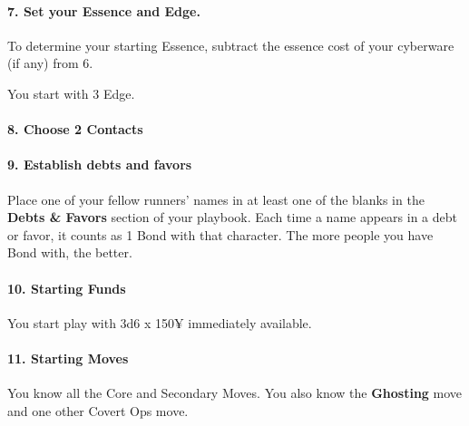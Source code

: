 \begin{multicols}{3}
\paragraph{7.  Set your Essence and Edge.}

To determine your starting Essence, subtract the
essence cost of your cyberware (if any) from 6.

You start with 3 Edge.

\paragraph{8.  Choose 2 Contacts}




\paragraph{9.  Establish debts and favors}

Place one of your fellow runners’ names in at
least one of the blanks in the \textbf{Debts \& Favors}
section of your playbook. Each time a name
appears in a debt or favor, it counts as 1 Bond
with that character. The more people you have
Bond with, the better.

\paragraph{10.  Starting Funds}

You start play with 3d6 x 150¥ immediately
available.

\paragraph{11.  Starting Moves}

You know all the Core and Secondary Moves.
You also know the \textbf{Ghosting} move and
one other Covert Ops move.

\end{multicols}

\newpage

